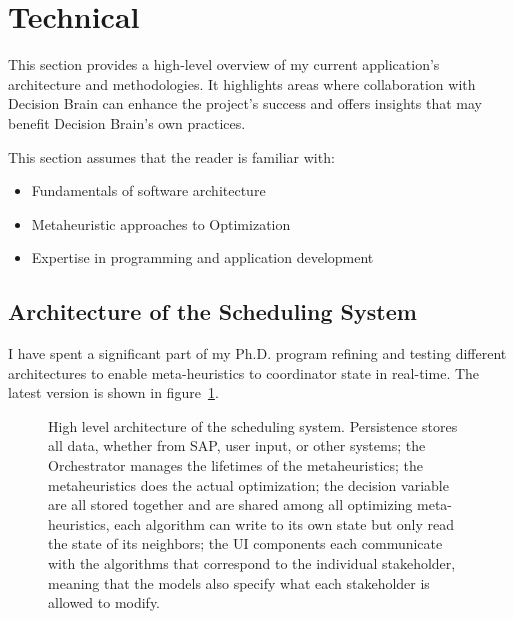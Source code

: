 \newpage
\section*{Technical}
\label{sec:technical}
This section provides a high-level overview of my current application's
architecture and methodologies. It highlights areas where collaboration with
Decision Brain can enhance the project's success and offers insights that may
benefit Decision Brain's own practices. 

This section assumes that the reader is familiar with:
\begin{itemize}
	\item Fundamentals of software architecture
	\item Metaheuristic approaches to Optimization
	\item Expertise in programming and application development
\end{itemize}

\subsection*{Architecture of the Scheduling System}
I have spent a significant part of my Ph.D. program refining and testing different architectures to enable
meta-heuristics to coordinator state in real-time. The latest version is shown in figure~\ref{fig:ordinator:architecture}.

\begin{figure}[H]
	\centering
	

	\caption{
		High level architecture of the scheduling system. Persistence stores
		all data, whether from SAP, user input, or other systems; the Orchestrator manages the lifetimes of the 
		metaheuristics; the metaheuristics does the actual optimization;
		the decision variable are all stored together and are shared among all optimizing meta-heuristics, 
		each algorithm can write to its own state but only read the state of its neighbors; the UI components
		each communicate with the algorithms that correspond to the individual stakeholder, meaning that the 
		models also specify what each stakeholder is allowed to modify.
	}
	\label{fig:ordinator:architecture}
\end{figure}

